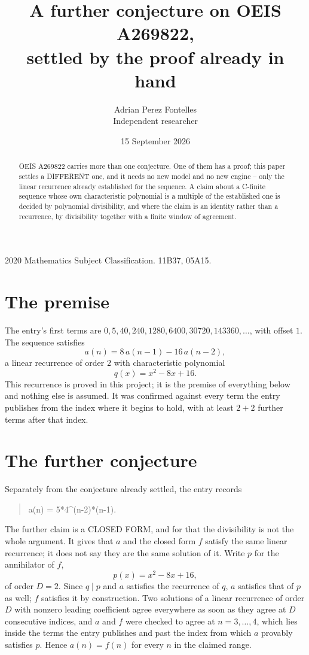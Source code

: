 \documentclass[11pt,a4paper]{article}
\title{A further conjecture on OEIS A269822,\\ \large settled by the proof already in hand}
\author{Adrian Perez Fontelles\\ \small Independent researcher}
\date{15 September 2026}
\theoremstyle{plain}
\theoremstyle{definition}
\begin{document}
\maketitle

\begin{abstract}
OEIS A269822 carries more than one conjecture. One of them has a proof; this paper settles a
DIFFERENT one, and it needs no new model and no new engine -- only the linear recurrence already
established for the sequence. A claim about a C-finite sequence whose own characteristic
polynomial is a multiple of the established one is decided by polynomial divisibility, and where
the claim is an identity rather than a recurrence, by divisibility together with a finite window
of agreement.
\end{abstract}

\noindent\small 2020 Mathematics Subject Classification. 11B37, 05A15.\normalsize

\section{The premise}

The entry's first terms are $0, 5, 40, 240, 1280, 6400, 30720, 143360,\dots$, with offset $1$. The sequence satisfies
\[
  a(n)=8\,a(n-1) - 16\,a(n-2) ,
\]
a linear recurrence of order $2$ with characteristic polynomial
\[
  q(x)=x^{2} - 8 x + 16 .
\]
This recurrence is proved in this project; it is the premise of everything below and nothing else is assumed.
It was confirmed against every term the entry publishes from the index where it begins to hold,
with at least $2+2$ further terms after that index.

\section{The further conjecture}

Separately from the conjecture already settled, the entry records

\begin{quote}\raggedright a(n) = 5*4\^{}(n-2)*(n-1).\end{quote}

The further claim is a CLOSED FORM, and for that the divisibility is not the whole argument. It
gives that $a$ and the closed form $f$ satisfy the same linear recurrence; it does not say they
are the same solution of it. Write $p$ for the annihilator of $f$,
\[
  p(x)=x^{2} - 8 x + 16 ,
\]
of order $D=2$. Since $q\mid p$ and $a$ satisfies the recurrence of $q$, $a$ satisfies that of
$p$ as well; $f$ satisfies it by construction. Two solutions of a linear recurrence of order $D$
with nonzero leading coefficient agree everywhere as soon as they agree at $D$ consecutive
indices, and $a$ and $f$ were checked to agree at $n=3,\dots,4$,
which lies inside the terms the entry publishes and past the index from which $a$ provably
satisfies $p$. Hence $a(n)=f(n)$ for every $n$ in the claimed range.
\end{document}
